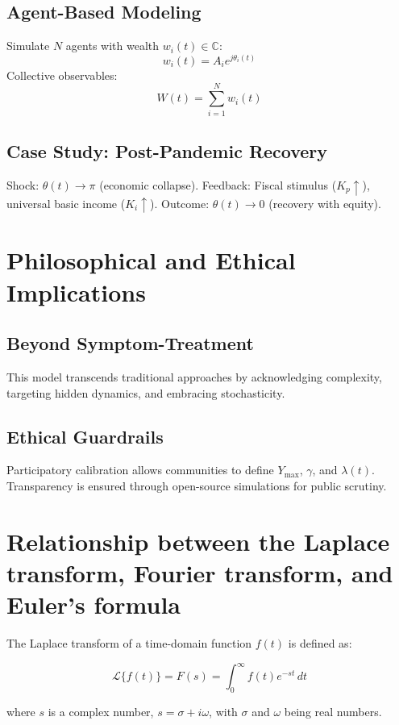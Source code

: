 \documentclass{article}
\theoremstyle{definition}
\begin{document}
\subsection{Agent-Based Modeling}
Simulate \( N \) agents with wealth \( w_i(t) \in \mathbb{C} \):
\[
w_i(t) = A_i e^{j\theta_i(t)}
\]
Collective observables:
\[
W(t) = \sum_{i=1}^N w_i(t)
\]

\subsection{Case Study: Post-Pandemic Recovery}
Shock: \( \theta(t) \rightarrow \pi \) (economic collapse). Feedback: Fiscal stimulus (\( K_p \uparrow \)), universal basic income (\( K_i \uparrow \)). Outcome: \( \theta(t) \rightarrow 0 \) (recovery with equity).

\section{Philosophical and Ethical Implications}

\subsection{Beyond Symptom-Treatment}
This model transcends traditional approaches by acknowledging complexity, targeting hidden dynamics, and embracing stochasticity.

\subsection{Ethical Guardrails}
Participatory calibration allows communities to define \( Y_{\max} \), \( \gamma \), and \( \lambda(t) \). Transparency is ensured through open-source simulations for public scrutiny.

\section{Relationship between the Laplace transform, Fourier transform, and Euler's formula}

The Laplace transform of a time-domain function $f(t)$ is defined as:

\begin{equation}
    \mathcal{L}\{f(t)\} = F(s) = \int_{0}^{\infty} f(t) e^{-st} \, dt
\end{equation}

where $s$ is a complex number, $s = \sigma + i\omega$, with $\sigma$ and $\omega$ being real numbers.
\end{document}
